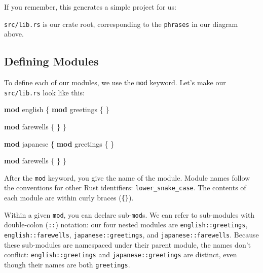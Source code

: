 \documentclass[a4paper,]{book}
\newenvironment{Shaded}{\begin{snugshade}}{\end{snugshade}}
\newcommand{\KeywordTok}[1]{\textcolor[rgb]{0.13,0.29,0.53}{\textbf{{#1}}}}
\newcommand{\NormalTok}[1]{{#1}}
\begin{document}
If you remember, this generates a simple project for us:

\begin{Shaded}
\end{Shaded}

\texttt{src/lib.rs} is our crate root, corresponding to the
\texttt{phrases} in our diagram above.

\subsection{Defining Modules}\label{defining-modules}

To define each of our modules, we use the \texttt{mod} keyword. Let's
make our \texttt{src/lib.rs} look like this:

\begin{Shaded}
\begin{Highlighting}[]
\KeywordTok{mod} \NormalTok{english \{}
    \KeywordTok{mod} \NormalTok{greetings \{}
    \NormalTok{\}}

    \KeywordTok{mod} \NormalTok{farewells \{}
    \NormalTok{\}}
\NormalTok{\}}

\KeywordTok{mod} \NormalTok{japanese \{}
    \KeywordTok{mod} \NormalTok{greetings \{}
    \NormalTok{\}}

    \KeywordTok{mod} \NormalTok{farewells \{}
    \NormalTok{\}}
\NormalTok{\}}
\end{Highlighting}
\end{Shaded}

After the \texttt{mod} keyword, you give the name of the module. Module
names follow the conventions for other Rust identifiers:
\texttt{lower\_snake\_case}. The contents of each module are within
curly braces (\texttt{\{\}}).

Within a given \texttt{mod}, you can declare sub-\texttt{mod}s. We can
refer to sub-modules with double-colon (\texttt{::}) notation: our four
nested modules are \texttt{english::greetings},
\texttt{english::farewells}, \texttt{japanese::greetings}, and
\texttt{japanese::farewells}. Because these sub-modules are namespaced
under their parent module, the names don't conflict:
\texttt{english::greetings} and \texttt{japanese::greetings} are
distinct, even though their names are both \texttt{greetings}.
\end{document}
